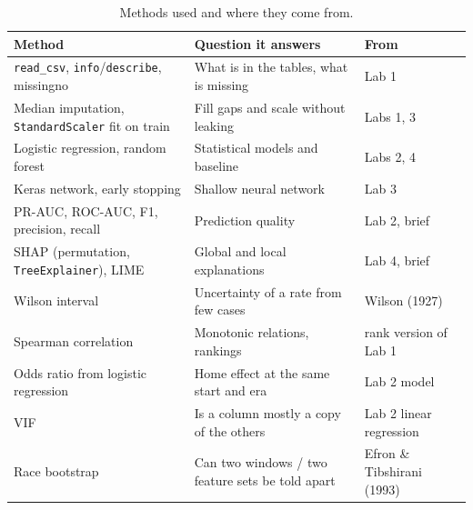 \documentclass[11pt,a4paper]{article}
\newcommand{\code}[1]{\texttt{#1}}
\begin{document}
\begin{table}[H]
\centering\small
\caption{Methods used and where they come from.}
\label{tab:methods}
\begin{tabularx}{\linewidth}{>{\raggedright\arraybackslash}p{5.4cm}>{\raggedright\arraybackslash}Xl}
\toprule
Method & Question it answers & From \\
\midrule
\code{read\_csv}, \code{info}/\code{describe}, missingno & What is in the tables, what is missing & Lab 1 \\
Median imputation, \code{StandardScaler} fit on train & Fill gaps and scale without leaking & Labs 1, 3 \\
Logistic regression, random forest & Statistical models and baseline & Labs 2, 4 \\
Keras network, early stopping & Shallow neural network & Lab 3 \\
PR-AUC, ROC-AUC, F1, precision, recall & Prediction quality & Lab 2, brief \\
SHAP (permutation, \code{TreeExplainer}), LIME & Global and local explanations & Lab 4, brief \\
Wilson interval & Uncertainty of a rate from few cases & Wilson (1927) \\
Spearman correlation & Monotonic relations, rankings & rank version of Lab 1 \\
Odds ratio from logistic regression & Home effect at the same start and era & Lab 2 model \\
VIF & Is a column mostly a copy of the others & Lab 2 linear regression \\
Race bootstrap & Can two windows / two feature sets be told apart & Efron \& Tibshirani (1993) \\
\bottomrule
\end{tabularx}
\end{table}
\end{document}
